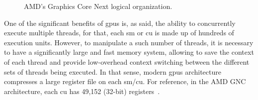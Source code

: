\begin{figure}[htb]
  \begin{subfigmatrix}{2}
  \end{subfigmatrix}
  \caption{AMD's Graphics Core Next logical organization.}
  \label{fig:Vega10arch}
\end{figure}


One of the significant benefits of \acrshort{gpu}s is, as said, the ability to concurrently execute multiple threads, for that, each \acrshort{sm} or \acrshort{cu} is made up of hundreds of execution units. However, to manipulate a such number of threads, it is necessary to have a significantly large and fast memory system, allowing to save the context of each thread and provide low-overhead context switching between the different sets of threads being executed. In that sense, modern \acrshort{gpu}s architecture compresses a large register file on each \acrshort{sm}/\acrshort{cu}. For reference, in the AMD GNC architecture, each \acrshort{cu} has 49,152 (32-bit) registers~\cite{jing_energy-efficient_2013}.


